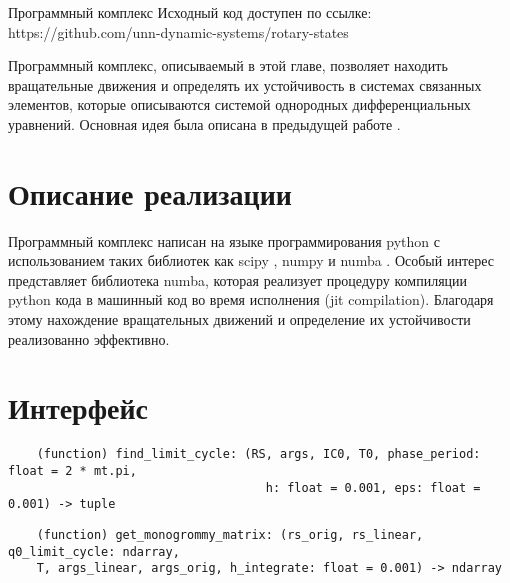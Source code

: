 \begin{chapter}{Программный комплекс}
	Исходный код доступен по ссылке: https://github.com/unn-dynamic-systems/rotary-states
	
	Программный комплекс, описываемый в этой главе, позволяет находить вращательные движения и
	определять их устойчивость в системах связанных элементов, которые описываются системой однородных
	дифференциальных уравнений. Основная идея была описана в предыдущей работе \cite{Khorkin}.

\section{Описание реализации}
Программный комплекс написан на языке программирования python с использованием таких
библиотек как scipy \cite{scipy}, numpy \cite{numpy} и numba \cite{numba}.
Особый интерес представляет библиотека numba, которая реализует процедуру 
компиляции python кода в машинный код во время исполнения (jit compilation).
Благодаря этому нахождение вращательных движений и определение их устойчивости реализованно эффективно.
\section{Интерфейс}

\begin{verbatim}
	(function) find_limit_cycle: (RS, args, IC0, T0, phase_period: float = 2 * mt.pi,
									h: float = 0.001, eps: float = 0.001) -> tuple
\end{verbatim}

\begin{verbatim}
	(function) get_monogrommy_matrix: (rs_orig, rs_linear, q0_limit_cycle: ndarray,
	T, args_linear, args_orig, h_integrate: float = 0.001) -> ndarray
\end{verbatim}

\end{chapter}